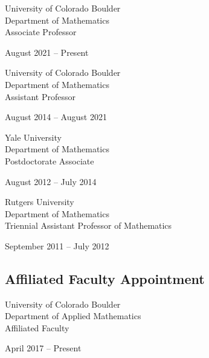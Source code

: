 \documentclass[letterpaper]{article}
\renewenvironment{itemize}{
  \begin{list}{}{
    \setlength{\leftmargin}{1em}
  }
}{
  \end{list}
}
\begin{document}
\begin{itemize}
	\item
	\begin{minipage}[t]{0.5\textwidth}
	University of Colorado Boulder \\
	Department of Mathematics \\
	Associate Professor 
	\end{minipage}
	\begin{minipage}[t]{0.5\textwidth}
	August 2021 -- Present
	\end{minipage}
	
	\item
	\begin{minipage}[t]{0.5\textwidth}
	University of Colorado Boulder \\
	Department of Mathematics \\
	Assistant Professor 
	\end{minipage}
	\begin{minipage}[t]{0.5\textwidth}
	August 2014 -- August 2021
	\end{minipage}

	\item 
	\begin{minipage}[t]{0.5\textwidth}
	Yale University \\
	Department of Mathematics \\
	Postdoctorate Associate 
	\end{minipage}
	\begin{minipage}[t]{0.5\textwidth}
	August 2012 -- July 2014
	\end{minipage}

	\item 
	\begin{minipage}[t]{0.5\textwidth}
	Rutgers University \\
	Department of Mathematics \\
	Triennial Assistant Professor of Mathematics
	\end{minipage}
	\begin{minipage}[t]{0.5\textwidth}
	September 2011 -- July 2012
	\end{minipage}
\end{itemize}


\subsection*{Affiliated Faculty Appointment}
\begin{itemize}
	\item
	\begin{minipage}[t]{0.5\textwidth}
	University of Colorado Boulder \\
	Department of Applied Mathematics \\
	Affiliated Faculty
	\end{minipage}
	\begin{minipage}[t]{0.5\textwidth}
	April 2017 -- Present
	\end{minipage}
\end{itemize}
\end{document}
